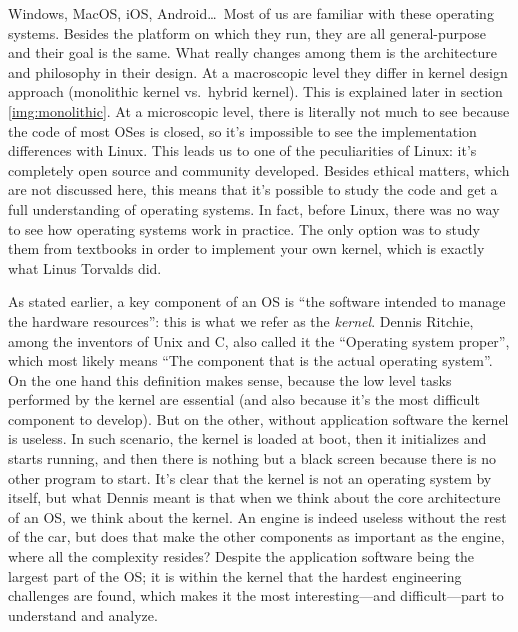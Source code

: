 Windows, MacOS, iOS, Android\dots\   Most of us are familiar with these operating systems. Besides the platform on which they run, they are all general-purpose and their goal is the same. What really changes among them is the architecture and philosophy in their design. At a macroscopic level they differ in kernel design approach (monolithic kernel vs.\ hybrid kernel). This is explained later in section \ref{img:monolithic}. At a microscopic level, there is literally not much to see because the code of most OSes is closed, so it's impossible to see the implementation differences with Linux. This leads us to one of the peculiarities of Linux: it's completely open source and community developed. Besides ethical matters, which are not discussed here, this means that it's possible to study the code and get a full understanding of operating systems. In fact, before Linux, there was no way to see how operating systems work in practice. The only option was to study them from textbooks in order to implement your own kernel, which is exactly what Linus Torvalds did.

As stated earlier, a key component of an OS is ``the software intended to manage the hardware resources'': this is what we refer as the \textit{kernel}. Dennis Ritchie, among the inventors of Unix and C, also called it the ``Operating system proper''\cite{ritchie}, which most likely means ``The component that is the actual operating system''. On the one hand this definition makes sense, because the low level tasks performed by the kernel are essential (and also because it's the most difficult component to develop). But on the other, without application software the kernel is useless. In such scenario, the kernel is loaded at boot, then it initializes and starts running, and then there is nothing but a black screen because there is no other program to start. It's clear that the kernel is not an operating system by itself, but what Dennis meant is that when we think about the core architecture of an OS, we think about the kernel. An engine is indeed useless without the rest of the car, but does that make the other components as important as the engine, where all the complexity resides? Despite the application software being the largest part of the OS; it is within the kernel that the hardest engineering challenges are found, which makes it the most interesting---and difficult---part to understand and analyze.

